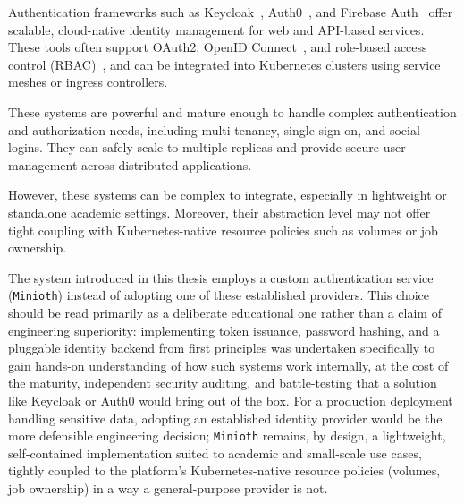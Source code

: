 Authentication frameworks such as Keycloak~\cite{keycloak}, Auth0~\cite{auth0}, and Firebase Auth~\cite{firebase-auth} offer scalable, cloud-native identity management 
for web and API-based services. These tools often support OAuth2, OpenID Connect~\cite{openid-connect}, and role-based access control (RBAC)~\cite{sandhu-rbac}, and can be 
integrated into Kubernetes clusters using service meshes or ingress controllers.

These systems are powerful and mature enough to handle complex authentication and authorization needs, including multi-tenancy, single sign-on, and social logins. 
They can safely scale to multiple replicas and provide secure user management across distributed applications.

However, these systems can be complex to integrate, especially in lightweight or standalone academic settings. Moreover, their
abstraction level may not offer tight coupling with Kubernetes-native resource policies such as volumes or job ownership.

The system introduced in this thesis employs a custom authentication service (\texttt{Minioth}) instead of adopting one of
these established providers. This choice should be read primarily as a deliberate educational one rather than a claim of
engineering superiority: implementing token issuance, password hashing, and a pluggable identity backend from first
principles was undertaken specifically to gain hands-on understanding of how such systems work internally, at the cost
of the maturity, independent security auditing, and battle-testing that a solution like Keycloak or Auth0 would bring
out of the box. For a production deployment handling sensitive data, adopting an established identity provider would be
the more defensible engineering decision; \texttt{Minioth} remains, by design, a lightweight, self-contained implementation
suited to academic and small-scale use cases, tightly coupled to the platform's Kubernetes-native resource policies
(volumes, job ownership) in a way a general-purpose provider is not.
